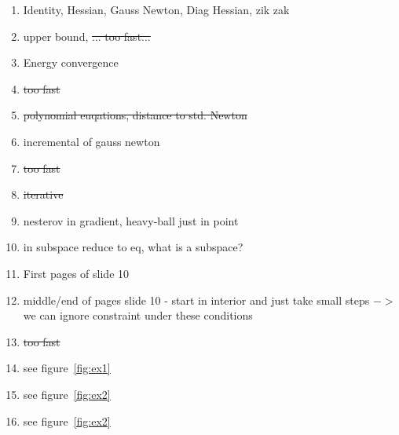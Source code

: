 \documentclass{report}
\begin{document}
\begin{enumerate}
\item Identity, Hessian, Gauss Newton, Diag Hessian, zik zak
\item upper bound, \sout{... too fast...}
\item Energy convergence 
\item \sout{too fast}
\item \sout{polynomial euqations, distance to std. Newton}
\item incremental of gauss newton
\item \sout{too fast}
\item \sout{iterative}
\item nesterov in gradient, heavy-ball just in point
\item in subspace reduce to eq, what is a subspace?
\item First pages of slide 10
\item middle/end of pages slide 10 - start in interior and just take small steps $->$ we can ignore constraint under these conditions
\item \sout{too fast}
\item see figure~\ref{fig:ex1}

\item see figure~\ref{fig:ex2}

\item see figure~\ref{fig:ex2}


\end{enumerate}
\end{document}
